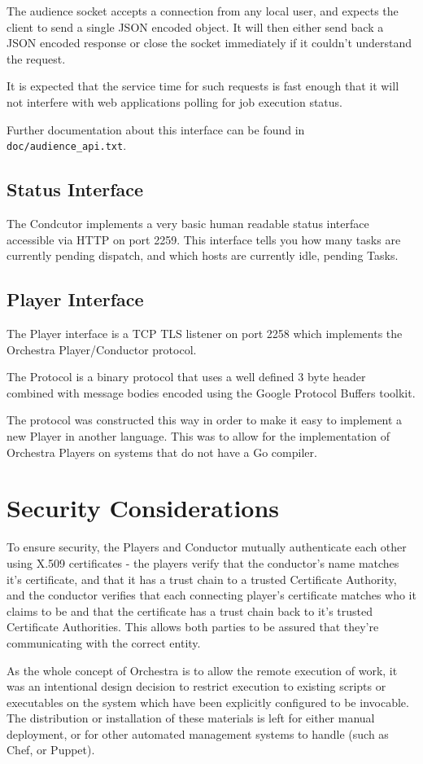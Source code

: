 \documentclass[a4paper]{article}
\begin{document}
The audience socket accepts a connection from any local user, and
expects the client to send a single JSON encoded object.  It will then
either send back a JSON encoded response or close the socket
immediately if it couldn't understand the request.  

It is expected that the service time for such requests is fast enough
that it will not interfere with web applications polling for job
execution status.

Further documentation about this interface can be found in {\tt
  doc/audience\_api.txt}.

\subsection{Status Interface}

The Condcutor implements a very basic human readable status interface
accessible via HTTP on port 2259.  This interface tells you how many
tasks are currently pending dispatch, and which hosts are currently
idle, pending Tasks.

\subsection{Player Interface}

The Player interface is a TCP TLS listener on port 2258 which
implements the Orchestra Player/Conductor protocol.

The Protocol is a binary protocol that uses a well defined 3 byte
header combined with message bodies encoded using the Google Protocol
Buffers toolkit.

The protocol was constructed this way in order to make it easy to
implement a new Player in another language.  This was to allow for the
implementation of Orchestra Players on systems that do not have a Go
compiler.

\section{Security Considerations}

To ensure security, the Players and Conductor mutually authenticate
each other using X.509 certificates - the players verify that the
conductor's name matches it's certificate, and that it has a trust
chain to a trusted Certificate Authority, and the conductor verifies
that each connecting player's certificate matches who it claims to be
and that the certificate has a trust chain back to it's trusted
Certificate Authorities.  This allows both parties to be assured that
they're communicating with the correct entity.

As the whole concept of Orchestra is to allow the remote execution of
work, it was an intentional design decision to restrict execution to
existing scripts or executables on the system which have been
explicitly configured to be invocable.  The distribution or
installation of these materials is left for either manual deployment,
or for other automated management systems to handle (such as Chef, or
Puppet).
\end{document}
